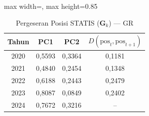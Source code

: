 \begin{table}[H]
\centering
\caption{Pergeseran Posisi STATIS ($\mathbf{G}_k$) --- GR} \label{tab:app2jarak_statis_loading_gr}
\begin{adjustbox}{max width=\textwidth, max height=0.85\textheight}
\begin{tabular}{|c|c|c|c|}
\hline
\textbf{Tahun} & \textbf{PC1} & \textbf{PC2} & \textbf{$D(\text{pos}_t, \text{pos}_{t+1})$} \\
\hline
2020 & 0,5593 & 0,3364 & 0,1181 \\
2021 & 0,4840 & 0,2454 & 0,1348 \\
2022 & 0,6188 & 0,2443 & 0,2479 \\
2023 & 0,8087 & 0,0849 & 0,2402 \\
2024 & 0,7672 & 0,3216 & -- \\
\hline
\end{tabular}
\end{adjustbox}
\end{table}